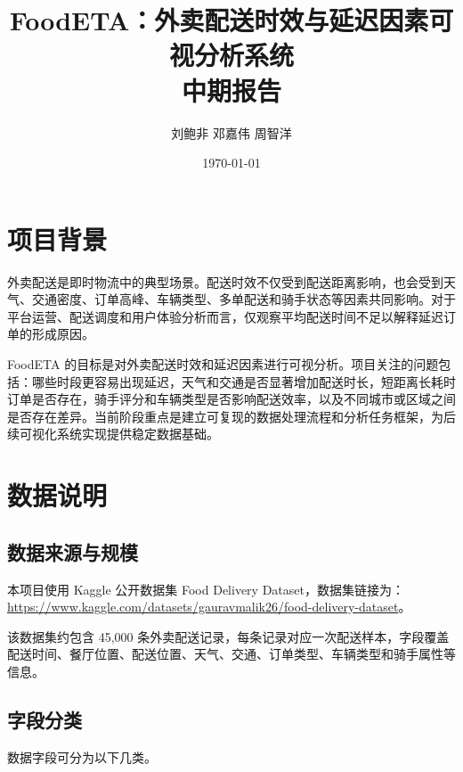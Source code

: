 \documentclass[UTF8, a4paper, 12pt, fontset=fandol]{ctexart}
\title{FoodETA：外卖配送时效与延迟因素可视分析系统\\中期报告}
\author{
  刘鲍非 \quad 邓嘉伟 \quad 周智洋\\
}
\date{\today}
\begin{document}
\maketitle

\section{项目背景}

外卖配送是即时物流中的典型场景。配送时效不仅受到配送距离影响，也会受到天气、交通密度、订单高峰、车辆类型、多单配送和骑手状态等因素共同影响。对于平台运营、配送调度和用户体验分析而言，仅观察平均配送时间不足以解释延迟订单的形成原因。

FoodETA 的目标是对外卖配送时效和延迟因素进行可视分析。项目关注的问题包括：哪些时段更容易出现延迟，天气和交通是否显著增加配送时长，短距离长耗时订单是否存在，骑手评分和车辆类型是否影响配送效率，以及不同城市或区域之间是否存在差异。当前阶段重点是建立可复现的数据处理流程和分析任务框架，为后续可视化系统实现提供稳定数据基础。

\section{数据说明}

\subsection{数据来源与规模}

本项目使用 Kaggle 公开数据集 Food Delivery Dataset，数据集链接为：\url{https://www.kaggle.com/datasets/gauravmalik26/food-delivery-dataset}。

该数据集约包含 45,000 条外卖配送记录，每条记录对应一次配送样本，字段覆盖配送时间、餐厅位置、配送位置、天气、交通、订单类型、车辆类型和骑手属性等信息。

\subsection{字段分类}

数据字段可分为以下几类。
\end{document}
